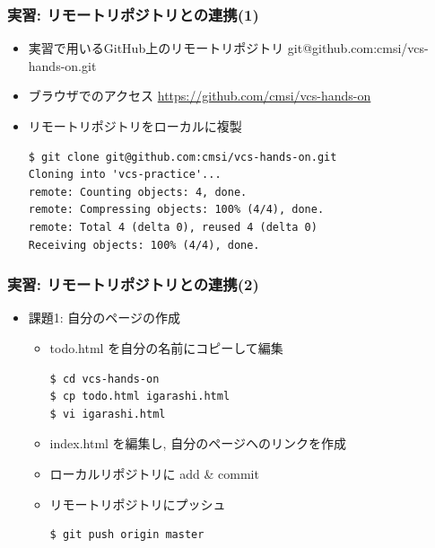 \begin{frame}[t,fragile]
  \frametitle{実習: リモートリポジトリとの連携(1)}
  \begin{itemize}
  \item 実習で用いるGitHub上のリモートリポジトリ git@github.com:cmsi/vcs-hands-on.git
  \item ブラウザでのアクセス \url{https://github.com/cmsi/vcs-hands-on}
  \item リモートリポジトリをローカルに複製
\begin{lstlisting}
$ git clone git@github.com:cmsi/vcs-hands-on.git
Cloning into 'vcs-practice'...
remote: Counting objects: 4, done.
remote: Compressing objects: 100% (4/4), done.
remote: Total 4 (delta 0), reused 4 (delta 0)
Receiving objects: 100% (4/4), done.
\end{lstlisting}
  \end{itemize}
\end{frame}

\begin{frame}[t,fragile]
  \frametitle{実習: リモートリポジトリとの連携(2)}
  \begin{itemize}
  \item 課題1: 自分のページの作成
    \begin{itemize}
      \item todo.html を自分の名前にコピーして編集
\begin{lstlisting}
$ cd vcs-hands-on
$ cp todo.html igarashi.html
$ vi igarashi.html
\end{lstlisting}
      \item index.html を編集し, 自分のページヘのリンクを作成
      \item ローカルリポジトリに add \& commit
      \item リモートリポジトリにプッシュ
\begin{lstlisting}
$ git push origin master
\end{lstlisting}
    \end{itemize}
  \end{itemize}
\end{frame}

